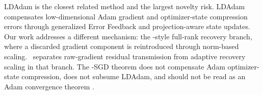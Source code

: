 LDAdam is the closest related method and the largest novelty risk. LDAdam
compensates low-dimensional Adam gradient and optimizer-state compression
errors through generalized Error Feedback and projection-aware state updates.
Our work addresses a different mechanism: the \Fira-style full-rank recovery
branch, where a discarded gradient component is reintroduced through norm-based
scaling. \BECR\ separates raw-gradient residual transmission from adaptive
recovery scaling in that branch. The \BECR-SGD theorem does not compensate Adam
optimizer-state compression, does not subsume LDAdam, and should not be read as
an Adam convergence theorem \citep{ldadam}.

\begin{table}[h]
\caption{Compact related-work boundary table.}
\label{tab:related-work}

\end{table}
